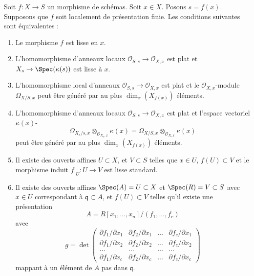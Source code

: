 \begin{lemma}
\label{lemma-smooth-at-point}
Soit $f : X \to S$ un morphisme de schémas. Soit $x \in X$.
Posons $s = f(x)$.
Supposons que $f$
soit localement de présentation finie. Les conditions
suivantes sont équivalentes :
\begin{enumerate}
\item Le morphisme $f$ est lisse en $x$.
\item L'homomorphisme d'anneaux locaux $\mathcal{O}_{S, s} \to \mathcal{O}_{X, x}$ est plat
et $X_s \to \Spec(\kappa(s))$ est lisse à $x$.
\item L'homomorphisme local d'anneaux $\mathcal{O}_{S, s} \to \mathcal{O}_{X, x}$ est plat
et le $\mathcal{O}_{X, x}$-module $\Omega_{X/S, x}$ peut être
généré par au plus $\dim_x(X_{f(x)})$ éléments.
\item L'homomorphisme d'anneaux locaux $\mathcal{O}_{S, s} \to \mathcal{O}_{X, x}$ est plat et
l'espace vectoriel $\kappa(x)$-
$$
\Omega_{X_s/s, x} \otimes_{\mathcal{O}_{X_s, x}} \kappa(x) =
\Omega_{X/S, x} \otimes_{\mathcal{O}_{X, x}} \kappa(x)
$$
peut être généré par au plus $\dim_x(X_{f(x)})$ éléments.
\item Il existe des ouverts affines $U \subset X$,
et $V \subset S$ telles que $x \in U$, $f(U) \subset V$ et le
morphisme induit $f|_U : U \to V$ est lisse standard.
\item Il existe des ouverts affines $\Spec(A) = U \subset X$
et $\Spec(R) = V \subset S$ avec $x \in U$ correspondant
à $\mathfrak q \subset A$, et $f(U) \subset V$ telles qu'il
existe une présentation
$$
A = R[x_1, \ldots, x_n]/(f_1, \ldots, f_c)
$$
avec
$$
g =
\det
\left(
\begin{matrix}
\partial f_1/\partial x_1 &
\partial f_2/\partial x_1 &
\ldots &
\partial f_c/\partial x_1 \\
\partial f_1/\partial x_2 &
\partial f_2/\partial x_2 &
\ldots &
\partial f_c/\partial x_2 \\
\ldots & \ldots & \ldots & \ldots \\
\partial f_1/\partial x_c &
\partial f_2/\partial x_c &
\ldots &
\partial f_c/\partial x_c
\end{matrix}
\right)
$$
mappant à un élément de $A$ pas dans $\mathfrak q$.
\end{enumerate}
\end{lemma}

